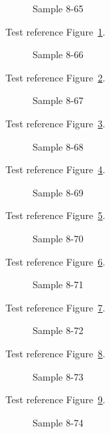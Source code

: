 \begin{figure}[tbhp]
\caption{Sample 8-65}
\label{fig:sample-8-65}
\end{figure}

Test reference Figure~\ref{fig:sample-8-65}.

\begin{figure}[tbhp]
\caption{Sample 8-66}
\label{fig:sample-8-66}
\end{figure}

Test reference Figure~\ref{fig:sample-8-66}.

\begin{figure}[tbhp]
\caption{Sample 8-67}
\label{fig:sample-8-67}
\end{figure}

Test reference Figure~\ref{fig:sample-8-67}.

\begin{figure}[tbhp]
\caption{Sample 8-68}
\label{fig:sample-8-68}
\end{figure}

Test reference Figure~\ref{fig:sample-8-68}.

\begin{figure}[tbhp]
\caption{Sample 8-69}
\label{fig:sample-8-69}
\end{figure}

Test reference Figure~\ref{fig:sample-8-69}.

\begin{figure}[tbhp]
\caption{Sample 8-70}
\label{fig:sample-8-70}
\end{figure}

Test reference Figure~\ref{fig:sample-8-70}.

\begin{figure}[tbhp]
\caption{Sample 8-71}
\label{fig:sample-8-71}
\end{figure}

Test reference Figure~\ref{fig:sample-8-71}.

\begin{figure}[tbhp]
\caption{Sample 8-72}
\label{fig:sample-8-72}
\end{figure}

Test reference Figure~\ref{fig:sample-8-72}.

\begin{figure}[tbhp]
\caption{Sample 8-73}
\label{fig:sample-8-73}
\end{figure}

Test reference Figure~\ref{fig:sample-8-73}.

\begin{figure}[tbhp]
\caption{Sample 8-74}
\label{fig:sample-8-74}
\end{figure}

